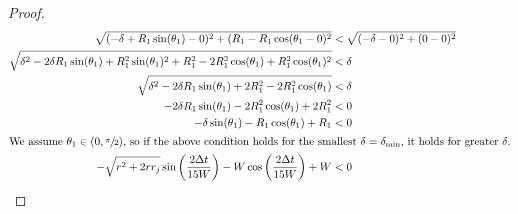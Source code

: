 \documentclass[conference]{IEEEtran}
\begin{document}
\begin{proof}
    \begin{align*}
      \sqrt{(-\delta+R_1\sin(\theta_1)-0)^2 + (R_1-R_1\cos(\theta_1-0)^2} &< \sqrt{(-\delta-0)^2 + (0-0)^2} \\
      \sqrt{\delta^2-2\delta R_1\sin(\theta_1) + R_1^2\sin(\theta_1)^2 + R_1^2-2R_1^2\cos(\theta_1)+R_1^2\cos(\theta_1)^2} &< \delta \\
      \sqrt{\delta^2-2\delta R_1\sin(\theta_1) + 2R_1^2-2R_1^2\cos(\theta_1)} &< \delta \\
      -2\delta R_1\sin(\theta_1) - 2R_1^2\cos(\theta_1) + 2R_1^2 &< 0 \\
      -\delta \sin(\theta_1) - R_1\cos(\theta_1) + R_1 &< 0 \\
      \intertext{We assume $\theta_1\in(0,\sfrac{\pi}{2})$, so if the above condition holds for the smallest $\delta=\delta_{\text{min}}$, it holds for greater $\delta$.}
      -\sqrt{r^2+2rr_j}\sin\bigg(\frac{2\Delta t}{15W}\bigg) - W\cos\bigg(\frac{2\Delta t}{15W}\bigg) + W &< 0
    \end{align*}
  \end{proof}
\end{document}
